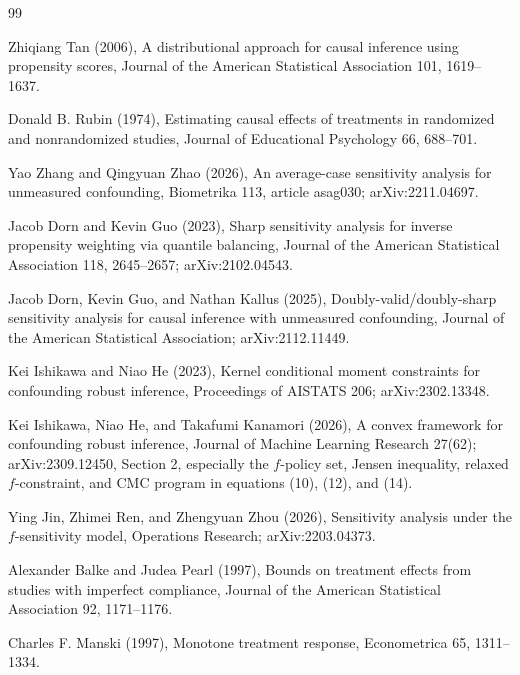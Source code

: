 \documentclass{article}
\begin{document}
\begin{thebibliography}{99}

   Zhiqiang Tan (2006), A distributional approach for causal inference using propensity scores, Journal of the American Statistical Association 101, 1619--1637.

   Donald B. Rubin (1974), Estimating causal effects of treatments in randomized and nonrandomized studies, Journal of Educational Psychology 66, 688--701.

   Yao Zhang and Qingyuan Zhao (2026), An average-case sensitivity analysis for unmeasured confounding, Biometrika 113, article asag030; arXiv:2211.04697.

   Jacob Dorn and Kevin Guo (2023), Sharp sensitivity analysis for inverse propensity weighting via quantile balancing, Journal of the American Statistical Association 118, 2645--2657; arXiv:2102.04543.

   Jacob Dorn, Kevin Guo, and Nathan Kallus (2025), Doubly-valid/doubly-sharp sensitivity analysis for causal inference with unmeasured confounding, Journal of the American Statistical Association; arXiv:2112.11449.

   Kei Ishikawa and Niao He (2023), Kernel conditional moment constraints for confounding robust inference, Proceedings of AISTATS 206; arXiv:2302.13348.

   Kei Ishikawa, Niao He, and Takafumi Kanamori (2026), A convex framework for confounding robust inference, Journal of Machine Learning Research 27(62); arXiv:2309.12450, Section 2, especially the \(f\)-policy set, Jensen inequality, relaxed \(f\)-constraint, and CMC program in equations (10), (12), and (14).

   Ying Jin, Zhimei Ren, and Zhengyuan Zhou (2026), Sensitivity analysis under the \(f\)-sensitivity model, Operations Research; arXiv:2203.04373.

   Alexander Balke and Judea Pearl (1997), Bounds on treatment effects from studies with imperfect compliance, Journal of the American Statistical Association 92, 1171--1176.

   Charles F. Manski (1997), Monotone treatment response, Econometrica 65, 1311--1334.


\end{thebibliography}
\end{document}
